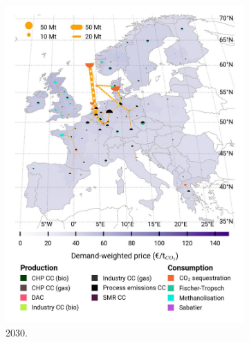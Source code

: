 \documentclass[preprint,12pt,sort&compress]{elsarticle}
\begin{document}
\begin{figure}[htbp]
\begin{subfigure}[t]{0.33\textwidth}
      \includegraphics[width=1\textwidth]{maps/pcipmi-national-international-expansion/base_s_adm___2030-balance_map_co2_stored} 
      \caption{ 2030.}
      \label{fig:PCI-in_lt_2030_co2}
  \end{subfigure}
  \begin{subfigure}[t]{0.33\textwidth}
      \vspace{0pt}

\end{subfigure}
\end{figure}
\end{document}
